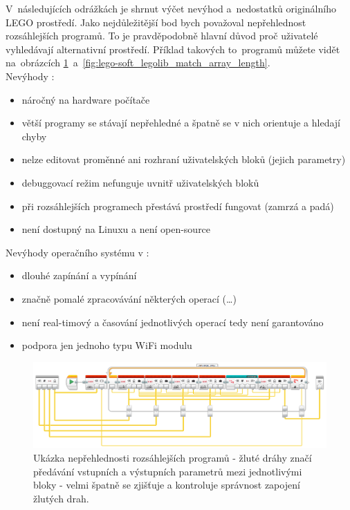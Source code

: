 V~následujících odrážkách je shrnut výčet nevýhod a~nedostatků originálního LEGO prostředí. 
Jako nejdůležitější bod bych považoval nepřehlednost rozsáhlejších programů. %
To je pravděpodobně hlavní důvod proč uživatelé \legoM{} vyhledávají alternativní prostředí. 
Příklad takových to~programů můžete vidět na~obrázcích \ref{fig:lego-soft_legolib_converge_array}~a~\ref{fig:lego-soft_legolib_match_array_length}.\\

Nevýhody \legoSW:

\renewcommand{\labelitemi}{$-$} %
\begin{itemize}[noitemsep]\itemsep2pt
	\item náročný na hardware počítače
	\item větší programy se stávají nepřehledné a špatně se v nich orientuje a hledají chyby
	\item nelze editovat proměnné ani rozhraní uživatelských bloků (jejich parametry)
	\item debuggovací režim nefunguje uvnitř uživatelských bloků
	\item při rozsáhlejších programech přestává prostředí fungovat (zamrzá a padá)
	\item není dostupný na Linuxu a není open-source
\end{itemize}

Nevýhody operačního systému v :  %
\begin{itemize}[noitemsep]\itemsep2pt
	\item dlouhé zapínání a vypínání
	\item značně pomalé zpracovávání některých operací (\dots) %
	\item není real-timový a časování jednotlivých operací tedy není garantováno
	\item podpora jen jednoho typu WiFi modulu
\end{itemize}
\renewcommand{\labelitemi}{$\bullet$} %

\begin{figure}[h]
	\centering
	\includegraphics[width=\textwidth]{images/lego-soft_legolib_converge_array.png}
	\caption[Ukázka nepřehlednosti rozsáhlejších programů]{Ukázka nepřehlednosti rozsáhlejších programů - žluté dráhy značí předávání vstupních a výstupních parametrů mezi jednotlivými bloky - velmi špatně se zjišťuje a kontroluje správnost zapojení žlutých drah.}
	\label{fig:lego-soft_legolib_converge_array}
\end{figure}
 
